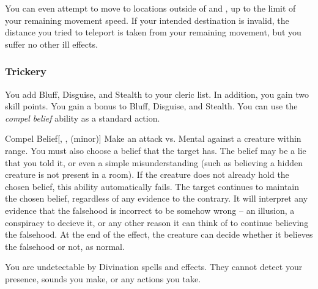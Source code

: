             You can even attempt to move to locations outside of  and , up to the limit of your remaining movement speed.
            If your intended destination is invalid, the distance you tried to teleport is taken from your remaining movement, but you suffer no other ill effects.

        \subsubsection{Trickery}
             You add Bluff, Disguise, and Stealth to your cleric  list.
            In addition, you gain two skill points.
             You gain a  bonus to Bluff, Disguise, and Stealth.
             You can use the \textit{compel belief} ability as a standard action.
            \begin{apability}{Compel Belief}[, ,  (minor)]
                Make an attack vs. Mental against a creature within \rngmed range.
                You must also choose a belief that the target has.
                The belief may be a lie that you told it, or even a simple misunderstanding (such as believing a hidden creature is not present in a room).
                If the creature does not already hold the chosen belief, this ability automatically fails.
                \hit The target continues to maintain the chosen belief, regardless of any evidence to the contrary.
                It will interpret any evidence that the falsehood is incorrect to be somehow wrong -- an illusion, a conspiracy to decieve it, or any other reason it can think of to continue believing the falsehood.
                At the end of the effect, the creature can decide whether it believes the falsehood or not, as normal.
            \end{apability}
             You are undetectable by Divination spells and effects.
            They cannot detect your presence, sounds you make, or any actions you take.

